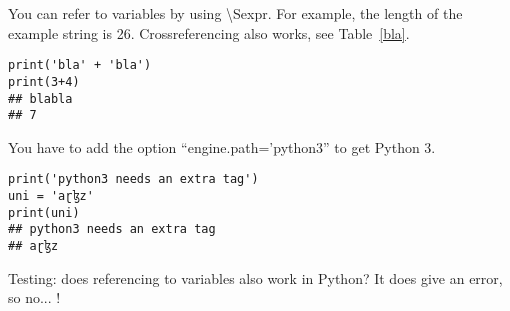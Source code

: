\documentclass[output=inprep,
		biblatex
		]{LSP/langsci}\usepackage[]{graphicx}\usepackage[]{color}
\makeatletter
\newenvironment{kframe}{%
 \def\at@end@of@kframe{}%
 \ifinner\ifhmode%
  \def\at@end@of@kframe{\end{minipage}}%
  \begin{minipage}{\columnwidth}%
 \fi\fi%
 \def\FrameCommand##1{\hskip\@totalleftmargin \hskip-\fboxsep
 \colorbox{shadecolor}{##1}\hskip-\fboxsep
     \hskip-\linewidth \hskip-\@totalleftmargin \hskip\columnwidth}%
 \MakeFramed {\advance\hsize-\width
   \@totalleftmargin\z@ \linewidth\hsize
   \@setminipage}}%
 {\par\unskip\endMakeFramed%
 \at@end@of@kframe}
\newenvironment{knitrout}{}{} %
\makeatother
\begin{document}
You can refer to variables by using \textbackslash Sexpr{}. 
For example, the length of the example string is 26.
Crossreferencing also works, see Table~\ref{bla}.

\begin{knitrout}\scriptsize
{}\color{fgcolor}\begin{kframe}
\begin{verbatim}
print('bla' + 'bla')
print(3+4)
## blabla
## 7
\end{verbatim}
\end{kframe}
\end{knitrout}

You have to add the option ``engine.path='python3'' to get Python 3.

\begin{knitrout}\scriptsize
{}\color{fgcolor}\begin{kframe}
\begin{verbatim}
print('python3 needs an extra tag')
uni = 'aɽɮz'
print(uni)
## python3 needs an extra tag
## aɽɮz
\end{verbatim}
\end{kframe}
\end{knitrout}

Testing: does referencing to variables also work in Python? It does give an error, so no... !






\begin{comment}
===
Double quotation marks are generally used for distancing, in particular in the following situations:

1. when a passage from another work is cited in the text (e.g. According to Takahashi (2009: 33), “quotatives were never used in subordinate clauses in Old Japanese”); but block quotations do not have quotation marks;
2. when a technical term is mentioned that the author does not want to adopt, but wants to mention, e.g. This is sometimes called “pseudo-conservatism”, but I will not use this term here, as it could lead to confusion.

Single quotation marks are used exclusively for linguistic meanings, as in the following: Latin habere ‘have’ is not cognate with Old English hafian ‘have’.

===
so, we should normally use double quotation in most of our cases :-). In general though, I would like us to try and remove double quotations as much as possible. Mostly is thus signals uncertainty on our part :-).

\end{comment}
\end{document}
